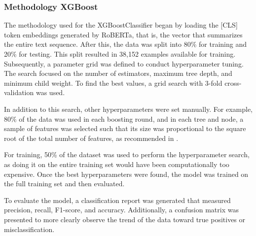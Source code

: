\subsubsection{Methodology XGBoost}

The methodology used for the XGBoostClassifier began by loading the [CLS] token embeddings generated by RoBERTa, that is, the vector that summarizes the entire text sequence. After this, the data was split into 80\% for training and 20\% for testing. This split resulted in 38,152 examples available for training. Subsequently, a parameter grid was defined to conduct hyperparameter tuning. The search focused on the number of estimators, maximum tree depth, and minimum child weight. To find the best values, a grid search with 3-fold cross-validation was used.

In addition to this search, other hyperparameters were set manually. For example, 80\% of the data was used in each boosting round, and in each tree and node, a sample of features was selected such that its size was proportional to the square root of the total number of features, as recommended in \cite{Chen2016XGBoost}.

For training, 50\% of the dataset was used to perform the hyperparameter search, as doing it on the entire training set would have been computationally too expensive. Once the best hyperparameters were found, the model was trained on the full training set and then evaluated.

To evaluate the model, a classification report was generated that measured precision, recall, F1-score, and accuracy. Additionally, a confusion matrix was presented to more clearly observe the trend of the data toward true positives or misclassification.

